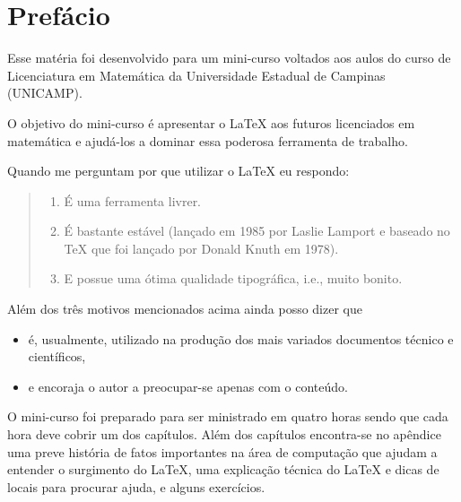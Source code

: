 % 
% 
% 
% 
% 
% 
%
%
\chapter{Pref\'{a}cio}
Esse mat\'{e}ria foi desenvolvido para um mini-curso voltados aos aulos do curso de Licenciatura em Matem\'{a}tica da Universidade Estadual de Campinas (UNICAMP).

O objetivo do mini-curso \'{e} apresentar o LaTeX aos futuros licenciados em matem\'{a}tica e ajud\'{a}-los a dominar essa poderosa ferramenta de trabalho.

\nocite{LaTeX_Project:EN:Home}Quando me perguntam por que utilizar o LaTeX eu respondo:
\begin{quote}
    \begin{enumerate}
        \item \'{E} uma ferramenta livrer.
        \item \'{E} bastante est\'{a}vel (lan\c{c}ado em 1985 por Laslie Lamport e baseado no TeX que foi lan\c{c}ado por Donald Knuth em 1978).
        \item E possue uma \'{o}tima qualidade tipogr\'{a}fica, i.e., muito bonito.
    \end{enumerate}
\end{quote}
Al\'{e}m dos tr\^{e}s motivos mencionados acima ainda posso dizer que
\begin{itemize}
    \item \'{e}, usualmente, utilizado na produ\c{c}\~{a}o dos mais variados documentos t\'{e}cnico e cient\'{i}ficos,
    \item e encoraja o autor a preocupar-se apenas com o conte\'{u}do.
\end{itemize}

O mini-curso foi preparado para ser ministrado em quatro horas sendo que cada hora deve cobrir um dos cap\'{i}tulos. Al\'{e}m dos cap\'{i}tulos encontra-se no ap\^{e}ndice uma preve hist\'{o}ria de fatos importantes na \'{a}rea de computa\c{c}\~{a}o que ajudam a entender o surgimento do LaTeX, uma explica\c{c}\~{a}o t\'{e}cnica do LaTeX e dicas de locais para procurar ajuda, e alguns exerc\'{i}cios.
